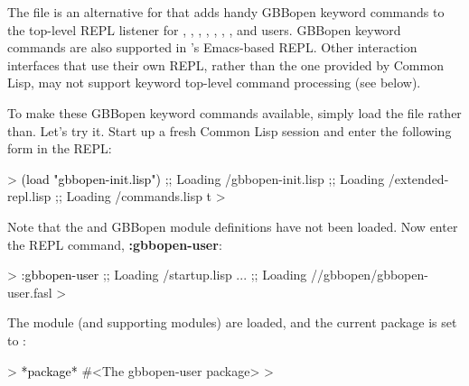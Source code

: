 \documentclass[10pt,twoside,english,pdftex]{article}
\begin{document}
The file is an
alternative for  that adds
handy GBBopen keyword commands to the top-level REPL listener for
,
,
,
,
,
,
,
 and
users.  GBBopen keyword commands
are also supported in
's Emacs-based REPL.
Other interaction interfaces that use their own REPL, rather than the one
provided by Common Lisp, may not support keyword top-level command processing
(see below).

To make these GBBopen keyword commands available, simply load the file
 rather
than.  Let's try it.  Start
up a fresh Common Lisp session and enter the following form in the REPL:
%
\begin{example}\color{darkergray}%
  > \textcolor{black}{(load "gbbopen-init.lisp")}
  ;; Loading /gbbopen-init.lisp
  ;;  Loading /extended-repl.lisp
  ;;  Loading /commands.lisp
  t
  >
\end{example}

%
Note that the  and GBBopen
module definitions have not been loaded.  Now enter the REPL
command, \textbf{:gbbopen-user}:
%
\begin{example}\color{darkergray}%
  > \textcolor{black}{:gbbopen-user}
  ;; Loading /startup.lisp
     ...
  ;; Loading //gbbopen/gbbopen-user.fasl
  >
\end{example}
%
The  module (and supporting modules) are loaded, and the
current package is set to :
%
\begin{example}\color{darkergray}%
  > \textcolor{black}{*package*}
  #<The gbbopen-user package>
  >
\end{example}
\end{document}

